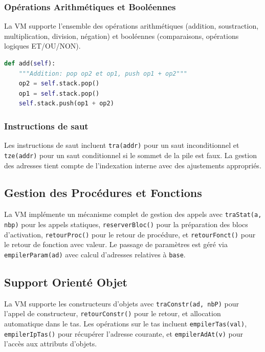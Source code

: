 \documentclass[a4paper, 12pt]{article}
\begin{document}
    \subsubsection{Opérations Arithmétiques et Booléennes}
    La VM supporte l'ensemble des opérations arithmétiques (addition, soustraction, multiplication, division, négation) et booléennes (comparaisons, opérations logiques ET/OU/NON).

    \begin{lstlisting}[caption=Exemple d'opération arithmétique,language=python, xleftmargin=20pt]
def add(self):
    """Addition: pop op2 et op1, push op1 + op2"""
    op2 = self.stack.pop()
    op1 = self.stack.pop()
    self.stack.push(op1 + op2) \end{lstlisting}

    \subsubsection{Instructions de saut}
    Les instructions de saut incluent \texttt{tra(addr)} pour un saut inconditionnel et \texttt{tze(addr)} pour un saut conditionnel si le sommet de la pile est faux. La gestion des adresses tient compte de l'indexation interne avec des ajustements appropriés.

    \subsection{Gestion des Procédures et Fonctions}

    La VM implémente un mécanisme complet de gestion des appels avec \texttt{traStat(a, nbp)} pour les appels statiques, \texttt{reserverBloc()} pour la préparation des blocs d'activation, \texttt{retourProc()} pour le retour de procédure, et \texttt{retourFonct()} pour le retour de fonction avec valeur. Le passage de paramètres est géré via \texttt{empilerParam(ad)} avec calcul d'adresses relatives à \texttt{base}.

    \subsection{Support Orienté Objet}

    La VM supporte les constructeurs d'objets avec \texttt{traConstr(ad, nbP)} pour l'appel de constructeur, \texttt{retourConstr()} pour le retour, et allocation automatique dans le tas. Les opérations sur le tas incluent \texttt{empilerTas(val)}, \texttt{empilerIpTas()} pour récupérer l'adresse courante, et \texttt{empilerAdAt(v)} pour l'accès aux attributs d'objets.
\end{document}
